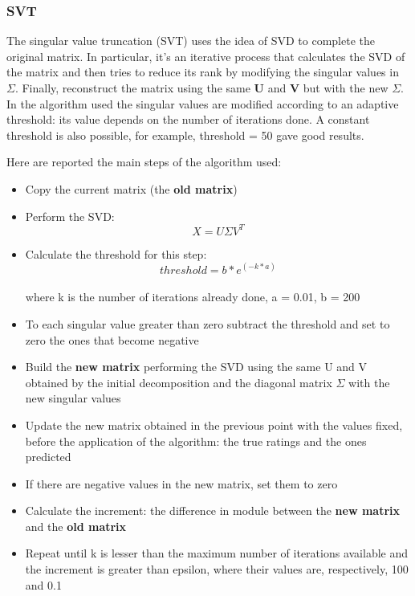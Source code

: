 \documentclass{article}
\begin{document}
\subsubsection{SVT}
The singular value truncation (SVT) uses the idea of SVD to complete the original matrix. In particular, it's an iterative process that calculates the SVD of the matrix and then tries to reduce its rank by modifying the singular values in $\Sigma$. Finally, reconstruct the matrix using the same \textbf{U} and \textbf{V} but with the new $\Sigma$. In the algorithm used the singular values are modified according to an adaptive threshold: its value depends on the number of iterations done. A constant threshold is also possible, for example, threshold = 50 gave good results.\newline

Here are reported the main steps of the algorithm used:

\begin{itemize}
    \item Copy the current matrix (the \textbf{old matrix})
    \item Perform the SVD: \begin{equation}X = U\Sigma V^T\end{equation}
    \item Calculate the threshold for this step: \begin{equation}
        threshold = b * e^{(-k * a)}
    \end{equation}\\
    where k is the number of iterations already done, a = 0.01, b = 200
    \item To each singular value greater than zero subtract the threshold and set to zero the ones that become negative
    \item Build the \textbf{new matrix} performing the SVD using the same U and V obtained by the initial decomposition and the diagonal matrix $\Sigma$ with the new singular values
    \item Update the new matrix obtained in the previous point with the values fixed, before the application of the algorithm: the true ratings and the ones predicted
    \item If there are negative values in the new matrix, set them to zero
    \item Calculate the increment: the difference in module between the \textbf{new matrix} and the \textbf{old matrix}
    \item Repeat until k is lesser than the maximum number of iterations available and the increment is greater than epsilon, where their values are, respectively, 100 and 0.1
\end{itemize}
\end{document}
